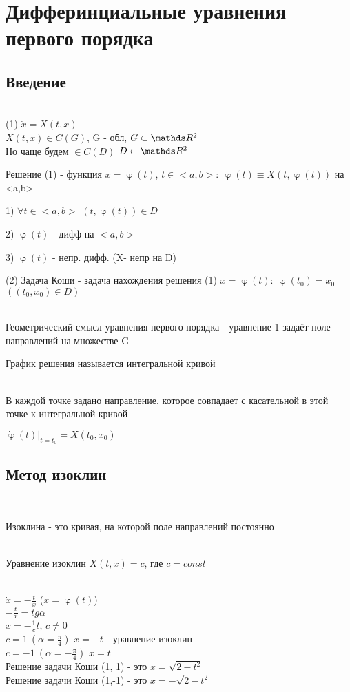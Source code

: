 \documentclass[main, 12pt, fleqn]{subfiles}
\begin{document}
\section{Дифферинциальные уравнения первого порядка}
\subsection{Введение}\ \\
(1) $\dot{x}=X(t,x)$
\\
$X(t,x) \in C(G)$, G - обл, $G \subset \R^2$
\\
Но чаще будем $\in C(D)$ $D \subset \R^2$

\begin{definition}
Решение (1) - функция $x=\upvarphi(t)$, $t \in <a,b>:\ \dot{\upvarphi}(t) \equiv X(t,\upvarphi(t))$ на <a,b>
\end{definition}

1) $\forall t \in <a,b>$ $(t, \upvarphi(t)) \in D$

2) $\upvarphi(t)$ - дифф на $<a,b>$

3) $\upvarphi(t)$ - непр. дифф. (X- непр на D)

\begin{definition}
(2) Задача Коши - задача нахождения решения (1) $x=\upvarphi(t):\ \upvarphi(t_0)=x_0$ $((t_0, x_0) \in D)$
\end{definition}
\\
Геометрический смысл уравнения первого порядка - уравнение 1 задаёт поле направлений на множестве G

\begin{definition}
График решения называется интегральной кривой
\end{definition}
\\
В каждой точке задано направление, которое совпадает с касательной в этой точке к интегральной кривой

$\dot{\upvarphi}(t) |_{t=t_0} = X(t_0, x_0)$
\\
\subsection{Метод изоклин}\
\begin{definition}
Изоклина - это кривая, на которой поле направлений постоянно
\end{definition}
\\
Уравнение изоклин $X(t,x)=c$, где $c=const$

\begin{instance}\ \\
$\dot{x}=-\frac{t}{x}$ ($x=\upvarphi(t)$)\\
$-\frac{t}{x}=tg \alpha$\\
$x=-\frac{1}{c} t$, $c \neq 0$\\
$c=1\ (\alpha=\frac{\pi}{4})$ $x=-t$ - уравнение изоклин\\
$c=-1\ (\alpha=-\frac{\pi}{4})$ $x=t$\\
Решение задачи Коши (1, 1) - это $x=\sqrt{2-t^2}$\\
Решение задачи Коши (1,-1) - это $x=-\sqrt{2-t^2}$
\end{instance}
\end{document}
